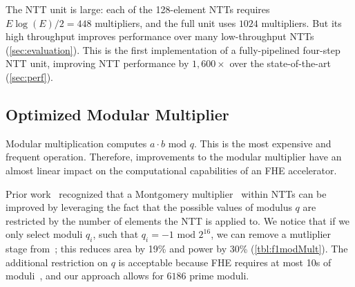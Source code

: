 The NTT unit is large: each of the 128-element NTTs requires $E \log
(E)/2=448$ multipliers, and the full unit uses $1024$ multipliers. But its
high throughput improves performance over many low-throughput NTTs
(\autoref{sec:evaluation}). This is the first implementation of a
fully-pipelined four-step NTT unit, improving NTT performance by $1,600\times$
over the state-of-the-art (\autoref{sec:perf}).


\subsection{Optimized Modular Multiplier}\label{sec:modMult}
\tblFOneModMult

Modular multiplication computes $a\cdot b \textrm{ mod } q$. This is the most
expensive and frequent operation. Therefore, improvements to the modular
multiplier have an almost linear impact on the computational capabilities of an
FHE accelerator.

Prior work~\cite{mert:euromicro19:design} recognized that a Montgomery
multiplier~\cite{montgomery:mom85:modular} within NTTs can be improved by
leveraging the fact that the possible values of modulus $q$ are restricted by
the number of elements the NTT is applied to. We notice that if we only select
moduli $q_i$, such that $q_i = -1 \textrm{ mod } 2^{16}$, we can remove a
mutliplier stage from~\cite{mert:euromicro19:design}; this reduces area by 19\%
and power by 30\% (\autoref{tbl:f1modMult}). The additional restriction on $q$
is acceptable because FHE requires at most 10s of
moduli~\cite{gentry:crypto2012:homomorphic}, and our approach allows for
$6186$ prime moduli.
